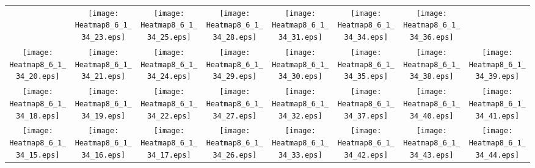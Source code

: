 \documentclass{standalone}
\begin{document}
\renewcommand{\arraystretch}{0}
\setlength{\tabcolsep}{0pt}
\begin{tabular}{ *8{c} }
 & \texttt{[image: Heatmap8\_6\_1\_34\_23.eps]} & \texttt{[image: Heatmap8\_6\_1\_34\_25.eps]} & \texttt{[image: Heatmap8\_6\_1\_34\_28.eps]} & \texttt{[image: Heatmap8\_6\_1\_34\_31.eps]} & \texttt{[image: Heatmap8\_6\_1\_34\_34.eps]} & \texttt{[image: Heatmap8\_6\_1\_34\_36.eps]} &  \\
\texttt{[image: Heatmap8\_6\_1\_34\_20.eps]} & \texttt{[image: Heatmap8\_6\_1\_34\_21.eps]} & \texttt{[image: Heatmap8\_6\_1\_34\_24.eps]} & \texttt{[image: Heatmap8\_6\_1\_34\_29.eps]} & \texttt{[image: Heatmap8\_6\_1\_34\_30.eps]} & \texttt{[image: Heatmap8\_6\_1\_34\_35.eps]} & \texttt{[image: Heatmap8\_6\_1\_34\_38.eps]} & \texttt{[image: Heatmap8\_6\_1\_34\_39.eps]} \\
\texttt{[image: Heatmap8\_6\_1\_34\_18.eps]} & \texttt{[image: Heatmap8\_6\_1\_34\_19.eps]} & \texttt{[image: Heatmap8\_6\_1\_34\_22.eps]} & \texttt{[image: Heatmap8\_6\_1\_34\_27.eps]} & \texttt{[image: Heatmap8\_6\_1\_34\_32.eps]} & \texttt{[image: Heatmap8\_6\_1\_34\_37.eps]} & \texttt{[image: Heatmap8\_6\_1\_34\_40.eps]} & \texttt{[image: Heatmap8\_6\_1\_34\_41.eps]} \\
\texttt{[image: Heatmap8\_6\_1\_34\_15.eps]} & \texttt{[image: Heatmap8\_6\_1\_34\_16.eps]} & \texttt{[image: Heatmap8\_6\_1\_34\_17.eps]} & \texttt{[image: Heatmap8\_6\_1\_34\_26.eps]} & \texttt{[image: Heatmap8\_6\_1\_34\_33.eps]} & \texttt{[image: Heatmap8\_6\_1\_34\_42.eps]} & \texttt{[image: Heatmap8\_6\_1\_34\_43.eps]} & \texttt{[image: Heatmap8\_6\_1\_34\_44.eps]} \\

\end{tabular}
\end{document}

